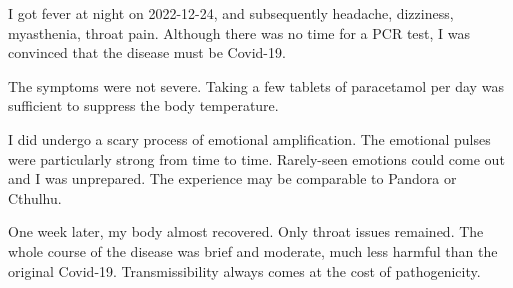 
\begin{multicols*}{2}
	I got fever at night on 2022-12-24, and subsequently headache, dizziness, myasthenia, throat pain.
	Although there was no time for a PCR test, I was convinced that the disease must be Covid-19.

    The symptoms were not severe. Taking a few tablets of paracetamol per day was sufficient to suppress the body temperature.

    I did undergo a scary process of emotional amplification.
    The emotional pulses were particularly strong from time to time.
    Rarely-seen emotions could come out and I was unprepared.
    The experience may be comparable to Pandora or Cthulhu.

    One week later, my body almost recovered. Only throat issues remained.
    The whole course of the disease was brief and moderate, much less harmful than the original Covid-19.
    Transmissibility always comes at the cost of pathogenicity.
\end{multicols*}
